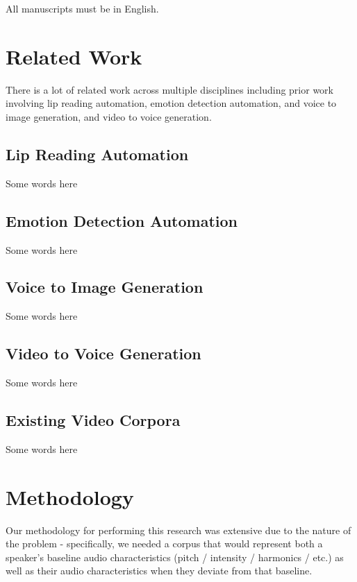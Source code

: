 \documentclass[10pt,twocolumn,letterpaper]{article}
\begin{document}
All manuscripts must be in English.


\section{Related Work}
\label{sec:related}

There is a lot of related work across multiple disciplines including prior work involving lip reading automation, emotion detection automation, and voice to image generation, and video to voice generation. 


\subsection{Lip Reading Automation}

Some words here

\subsection{Emotion Detection Automation}

Some words here

\subsection{Voice to Image Generation}

Some words here

\subsection{Video to Voice Generation}

Some words here

\subsection{Existing Video Corpora}

Some words here

\section{Methodology}
\label{sec:methodology}

Our methodology for performing this research was extensive due to the nature of the problem - specifically, we needed a corpus that would represent both a speaker's baseline audio characteristics (pitch / intensity / harmonics / etc.) as well as their audio characteristics when they deviate from that baseline. 
\end{document}
